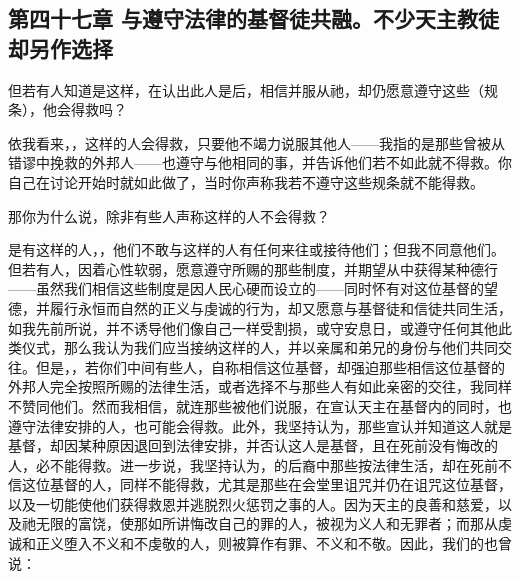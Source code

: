 
\subsection{第四十七章 与遵守法律的基督徒共融。不少天主教徒却另作选择}

但若有人知道是这样，在认出此人是后，相信并服从祂，却仍愿意遵守这些（规条），他会得救吗？\par

依我看来，，这样的人会得救，只要他不竭力说服其他人——我指的是那些曾被从错谬中挽救的外邦人——也遵守与他相同的事，并告诉他们若不如此就不得救。你自己在讨论开始时就如此做了，当时你声称我若不遵守这些规条就不能得救。\par

那你为什么说，除非有些人声称这样的人不会得救？\par

 是有这样的人，，他们不敢与这样的人有任何来往或接待他们；但我不同意他们。但若有人，因着心性软弱，愿意遵守所赐的那些制度，并期望从中获得某种德行——虽然我们相信这些制度是因人民心硬而设立的——同时怀有对这位基督的望德，并履行永恒而自然的正义与虔诚的行为，却又愿意与基督徒和信徒共同生活，如我先前所说，并不诱导他们像自己一样受割损，或守安息日，或遵守任何其他此类仪式，那么我认为我们应当接纳这样的人，并以亲属和弟兄的身份与他们共同交往。但是，，若你们中间有些人，自称相信这位基督，却强迫那些相信这位基督的外邦人完全按照所赐的法律生活，或者选择不与那些人有如此亲密的交往，我同样不赞同他们。然而我相信，就连那些被他们说服，在宣认天主在基督内的同时，也遵守法律安排的人，也可能会得救。此外，我坚持认为，那些宣认并知道这人就是基督，却因某种原因退回到法律安排，并否认这人是基督，且在死前没有悔改的人，必不能得救。进一步说，我坚持认为，的后裔中那些按法律生活，却在死前不信这位基督的人，同样不能得救，尤其是那些在会堂里诅咒并仍在诅咒这位基督，以及一切能使他们获得救恩并逃脱烈火惩罚之事的人。因为天主的良善和慈爱，以及祂无限的富饶，使那如所讲悔改自己的罪的人，被视为义人和无罪者；而那从虔诚和正义堕入不义和不虔敬的人，则被算作有罪、不义和不敬。因此，我们的也曾说：\par


